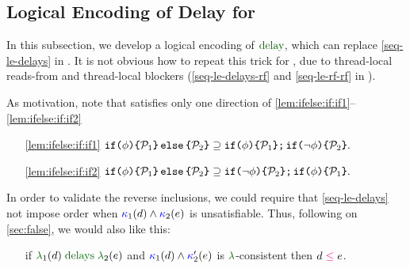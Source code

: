 \subsection{Logical Encoding of Delay for \PwTmcaTITLE{}}
\label{sec:delay}

In this subsection, we develop a logical encoding of $\rdelay$, which can
replace \ref{seq-le-delays} in .  It is not obvious how to repeat
this trick for , due to thread-local reads-from
and thread-local blockers (\ref{seq-le-delays-rf} and \ref{seq-le-rf-rf} in ).

As motivation, note that \PwTmca{} satisfies only one direction of
\eqref{lem:ifelse:if:if1}--\eqref{lem:ifelse:if:if2}
\begin{enumerate}
\item[\eqref{lem:ifelse:if:if1}]
  \begin{math} 
    \xIFTHEN{\aForm}{\aPSS_1}{\aPSS_2}
    \supseteq
    \xSEMI{
      \xIFTHEN{\aForm}{\aPSS_1}{}
    }{
      \xIFTHEN{\lnot\aForm}{\aPSS_2}{}
    }.
  \end{math}
  
\item[\eqref{lem:ifelse:if:if2}]
  \begin{math} 
    \xIFTHEN{\aForm}{\aPSS_1}{\aPSS_2}
    \supseteq
    \xSEMI{
      \xIFTHEN{\lnot\aForm}{\aPSS_2}{}
    }{
      \xIFTHEN{\aForm}{\aPSS_1}{}
    }.
  \end{math}
\end{enumerate}
In order to validate the reverse inclusions, we could require that
\ref{seq-le-delays} not impose order when
${\color{blue}\kappa}_1(d) \land {\color{blue}\kappa}_2(e)$ is unsatisfiable.
Thus, following on \textsection\ref{sec:false}, we would also like this:
\begin{enumerate}
\item[{\labeltext[\textsc{s}6b$'$]{(\textsc{s}6b$'$)}{seq-le-delays'}}] if
  $\labeling_1(\bEv) \rdelays \labeling_2(\aEv)$ and
  ${\color{blue}\kappa}_1(d) \land {\color{blue}\kappa}_2'(e)$ is
  $\labeling$-consistent then $\bEv\le\aEv$.
\end{enumerate}

